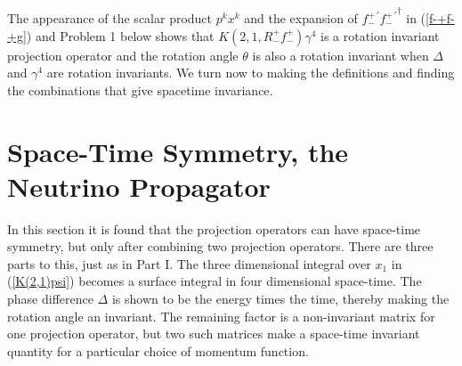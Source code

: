 \documentclass[a4paper,12pt]{article}
\begin{document}
	The appearance of the scalar product $p^{k} x^{k}$ and the expansion of $f_{-}^{+ \, \prime} {f_{-}^{+ \, \prime }}^{\dagger}$ in (\ref{f-+f-+g}) and Problem 1 below shows that $K(2,1,R_{-}^{+} f_{-}^{+})\gamma^{4}$ is a rotation invariant projection operator and the rotation angle $\theta$ is also a rotation invariant when $\Delta$ and $\gamma^{4}$ are rotation invariants. We turn now to making the definitions and finding the combinations that give spacetime invariance.

\section{Space-Time Symmetry, the Neutrino Propagator} \label{space-time} %

	In this section it is found that the projection operators can have space-time symmetry, but only after combining two projection operators.  There are three parts to this, just as in Part I. The three dimensional integral over $x_{1}$ in (\ref{K(2,1)psi}) becomes a surface integral in four dimensional space-time. The phase difference $\Delta$ is shown to be the energy times the time, thereby making the rotation angle an invariant. The remaining factor is a non-invariant matrix for one projection operator, but two such matrices make a space-time invariant quantity for a particular choice of momentum function.
\end{document}
